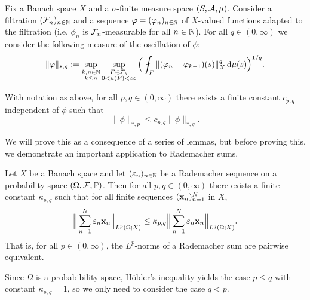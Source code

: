 Fix a Banach space $X$ and a $\sigma$-finite measure space $(S,\mathcal{A},\mu)$.
Consider a filtration $(\mathcal{F}_n)_{n \in \mathbb{N}}$ and a sequence $\varphi = (\varphi_n)_{n \in \mathbb{N}}$ of $X$-valued functions adapted to the filtration (i.e. $\phi_n$ is $\mathcal{F}_n$-measurable for all $n \in \mathbb{N}$).
For all $q \in (0,\infty)$ we consider the following measure of the oscillation of $\phi$:
\begin{equation*}
    \|\phi\|_{*,q} := \sup_{\substack{k,n \in \N \\ k \leq n}} \sup_{\substack{F \in \mc{F}_k \\ 0 < \mu(F) < \infty}} \Big( \fint_{F} \|(\phi_n - \phi_{k-1})(s)\|_{X}^{q} \, \dd\mu(s)\Big)^{1/q} .
\end{equation*}


\begin{thm}\label{thm:jn-adapted-sequences}
  With notation as above, for all $p,q \in (0,\infty)$ there exists a finite constant $c_{p,q}$ independent of $\phi$ such that
  \begin{equation*}
    \|\phi\|_{*,p} \leq c_{p,q} \|\phi\|_{*,q}.
  \end{equation*}
\end{thm}

We will prove this as a consequence of a series of lemmas, but before proving this, we demonstrate an important application to Rademacher sums.

\begin{thm}\label{thm:kk}
  Let $X$ be a Banach space and let $(\varepsilon_{n})_{n \in \mathbb{N}}$ be a Rademacher sequence on a probability space $(\Omega,\mathcal{F},\mathbb{P})$.
  Then for all $p,q \in (0,\infty)$ there exists a finite constant $\kappa_{p,q}$ such that for all finite sequences $(\mathbf{x}_n)_{n=1}^N$ in $X$,
  \begin{equation*}
    \Big\|\sum_{n=1}^{N} \varepsilon_{n} \mathbf{x}_{n} \Big\|_{L^p(\Omega;X)} \leq \kappa_{p,q} \Big\|\sum_{n=1}^{N} \varepsilon_{n} \mathbf{x}_{n} \Big\|_{L^q(\Omega;X)}.
  \end{equation*}
  That is, for all $p \in (0,\infty)$, the $L^p$-norms of a Rademacher sum are pairwise equivalent.  
\end{thm}

Since $\Omega$ is a probabibility space, H\"older's inequality yields the case $p \leq q$ with constant $\kappa_{p,q} = 1$, so we only need to consider the case $q < p$.

